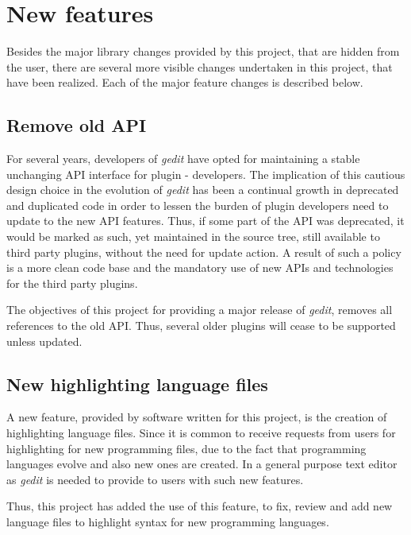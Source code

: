 
\section{New features}\label{sec:NewFeatures}

Besides the major library changes provided by this project, that are hidden from the 
user, there are several more visible changes undertaken in this project, that have been 
realized.  Each of the major feature changes is described below.


\subsection{Remove old API}\label{sec:RemoveOldAPI}

For several years, developers of \emph{gedit} have opted for maintaining a stable unchanging 
API interface for plugin - developers. The implication of this cautious design choice in the 
evolution of \emph{gedit} has been a continual growth in deprecated and duplicated code 
in order to lessen the burden of plugin developers need to update to the new API features. 
Thus, if some part of the API was deprecated, it would be marked as such, yet maintained 
in the source tree, still available to third party plugins, without the need for update action.
A result of such a policy is a more clean code base and the mandatory use of new APIs and 
technologies for the third party plugins.

The objectives of this project for providing a major release of \emph{gedit}, removes 
all references to the old API.  Thus, several older plugins will cease to be supported 
unless updated.


\subsection{New highlighting language files}\label{sec:HighFiles}

A new feature, provided by software written for this project, is the creation of 
highlighting language files.   Since it is common to receive requests from 
users for highlighting for new programming files, due to the fact that programming 
languages evolve and also new ones are created. In a general purpose text editor 
as \emph{gedit} is needed to provide to users with such new features.

Thus, this project has added the use of this feature, to fix, review and 
add new language files to highlight syntax for new programming languages.



